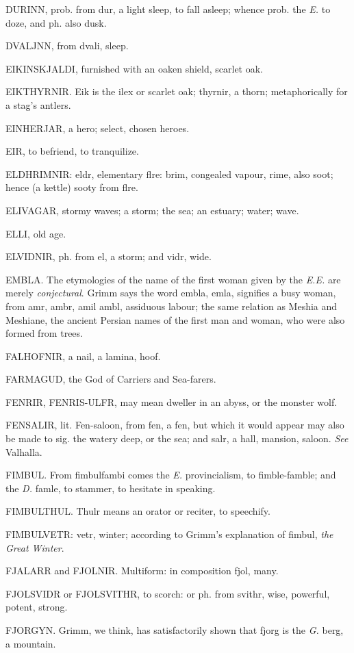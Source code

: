 DURINN, prob. from dur, a light sleep, to fall asleep; whence prob.
the \emph{E.} to doze, and ph. also dusk.

DVALJNN, from dvali, sleep.

EIKINSKJALDI, furnished with an oaken shield, scarlet oak.

EIKTHYRNIR. Eik is the ilex or scarlet oak; thyrnir, a thorn;
metaphorically for a stag's antlers.

EINHERJAR, a hero; select, chosen heroes.

EIR, to befriend, to tranquilize.

ELDHRIMNIR: eldr, elementary flre: brim, congealed vapour, rime, also
soot; hence (a kettle) sooty from flre.

ELIVAGAR, stormy waves; a storm; the sea; an estuary; water; wave.

ELLI, old age.

ELVIDNIR, ph. from el, a storm; and vidr, wide.

EMBLA. The etymologies of the name of the first woman given by the
\emph{E.E.} are merely \emph{conjectural}. Grimm says the word embla, emla,
signifies a busy woman, from amr, ambr, amil ambl, assiduous labour;
the same relation as Meshia and Meshiane, the ancient Persian names of
the first man and woman, who were also formed from trees.

FALHOFNIR, a nail, a lamina, hoof.

FARMAGUD, the God of Carriers and Sea-farers.

FENRIR, FENRIS-ULFR, may mean dweller in an abyss, or the monster
wolf.

FENSALIR, lit. Fen-saloon, from fen, a fen, but which it would appear
may also be made to sig. the watery deep, or the sea; and salr, a
hall, mansion, saloon. \emph{See} Valhalla.

FIMBUL. From fimbulfambi comes the \emph{E.} provincialism, to
fimble-famble; and the \emph{D.} famle, to stammer, to hesitate in
speaking.

FIMBULTHUL. Thulr means an orator or reciter, to speechify.

FIMBULVETR: vetr, winter; according to Grimm's explanation of fimbul,
\emph{the Great Winter}.

FJALARR and FJOLNIR. Multiform: in composition fjol, many.

FJOLSVIDR or FJOLSVITHR, to scorch: or ph. from svithr, wise,
powerful, potent, strong.

FJORGYN. Grimm, we think, has satisfactorily shown that fjorg is the
\emph{G.} berg, a mountain.


